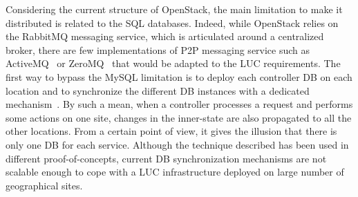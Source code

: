 Considering the current structure of OpenStack, the main limitation to make it distributed
is related to the SQL databases. Indeed, while OpenStack relies on the
RabbitMQ messaging service, which is articulated around a centralized
broker, there are few implementations of  P2P messaging
service such as ActiveMQ~\cite{activemq:2011} or ZeroMQ~\cite{zeromq:2013} that would be adapted to the LUC requirements.
%
%
%
%
The first way to bypass the MySQL limitation is to
deploy each controller DB on each location and to synchronize the different DB
instances with a dedicated mechanism~\cite{kemme:vldb2010}. By such a mean, when a
controller processes a request and performs some actions on one site, changes in the
inner-state are also propagated to all the other locations. From a certain point of view,
it gives the illusion that there is only one DB for each service. Although the technique
described has been used in different proof-of-concepts, current DB synchronization
mechanisms are not scalable enough to cope with a LUC infrastructure deployed on large
number of geographical sites.

